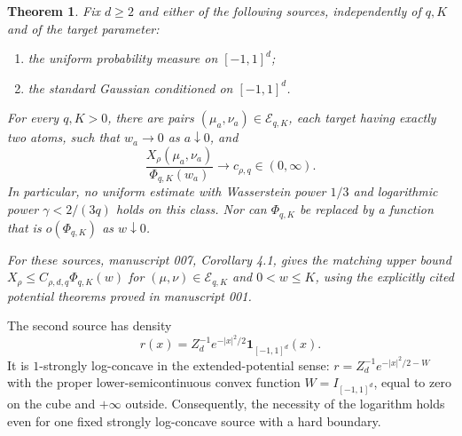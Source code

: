 \documentclass[11pt]{article}
\newtheorem{theorem}{Theorem}
\theoremstyle{remark}\newtheorem{remark}[theorem]{Remark}
\newcommand{\ind}{\mathbf 1}
\begin{document}
\begin{theorem}\label{thm:main}
Fix $d\ge2$ and either of the following sources, independently of
$q,K$ and of the target parameter:
\begin{enumerate}
\item the uniform probability measure on $[-1,1]^d$;
\item the standard Gaussian conditioned on $[-1,1]^d$.
\end{enumerate}
For every $q,K>0$, there are pairs $(\mu_a,\nu_a)\in\mathcal E_{q,K}$,
each target having exactly two atoms, such that $w_a\to0$ as
$a\downarrow0$, and
\[
 \frac{X_\rho(\mu_a,\nu_a)}{\Phi_{q,K}(w_a)}
       \longrightarrow c_{\rho,q}\in(0,\infty).
\]
In particular, no uniform estimate with Wasserstein power $1/3$ and
logarithmic power $\gamma<2/(3q)$ holds on this class. Nor can
$\Phi_{q,K}$ be replaced by a function that is $o(\Phi_{q,K})$ as
$w\downarrow0$.

For these sources, manuscript 007, Corollary 4.1, gives the matching
upper bound $X_\rho\le C_{\rho,d,q}\Phi_{q,K}(w)$ for
$(\mu,\nu)\in\mathcal E_{q,K}$ and $0<w\le K$, using the explicitly
cited potential theorems proved in manuscript 001.
\end{theorem}

The second source has density
\[
 r(x)=Z_d^{-1}e^{-|x|^2/2}\ind_{[-1,1]^d}(x).
\]
It is $1$-strongly log-concave in the extended-potential sense:
$r=Z_d^{-1}e^{-|x|^2/2-W}$ with the proper lower-semicontinuous convex
function $W=I_{[-1,1]^d}$, equal to zero on the cube and $+\infty$
outside. Consequently, the necessity of the logarithm holds even for
one fixed strongly log-concave source with a hard boundary.
\end{document}
